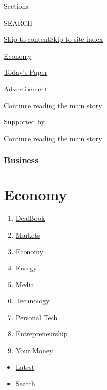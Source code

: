 Sections

SEARCH

\protect\hyperlink{site-content}{Skip to
content}\protect\hyperlink{site-index}{Skip to site index}

\href{https://www.nytimes3xbfgragh.onion/section/business/economy}{Economy}

\href{https://myaccount.nytimes3xbfgragh.onion/auth/login?response_type=cookie\&client_id=vi}{}

\href{https://www.nytimes3xbfgragh.onion/section/todayspaper}{Today's
Paper}

Advertisement

\protect\hyperlink{after-top}{Continue reading the main story}

Supported by

\protect\hyperlink{after-sponsor}{Continue reading the main story}

\hypertarget{business}{%
\subsubsection{\texorpdfstring{\href{/section/business}{Business}}{Business}}\label{business}}

\hypertarget{economy}{%
\section{Economy}\label{economy}}

\begin{enumerate}
\def\labelenumi{\arabic{enumi}.}
\tightlist
\item
  \href{/pages/business/dealbook/index.html}{DealBook}
\item
  \href{https://markets.on.nytimes3xbfgragh.onion}{Markets}
\item
  \href{/section/business/economy}{Economy}
\item
  \href{/section/business/energy-environment}{Energy}
\item
  \href{/section/business/media}{Media}
\item
  \href{/section/technology}{Technology}
\item
  \href{/section/technology/personaltech}{Personal Tech}
\item
  \href{/section/business/smallbusiness}{Entrepreneurship}
\item
  \href{/section/your-money}{Your Money}
\end{enumerate}

\begin{itemize}
\tightlist
\item
  \protect\hyperlink{stream-panel}{Latest}
\item
  Search
\end{itemize}

